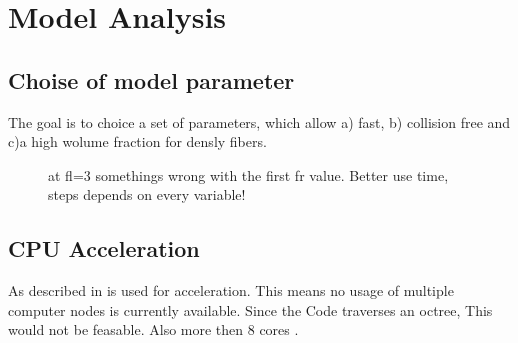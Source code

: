 \chapter{Model Analysis}
\label{cha:model_analysis}
% 
\section{Choise of model parameter}
% 
The goal is to choice a set of parameters, which allow a) fast, b) collision free and c)a high wolume fraction for densly fibers. 
% 
\begin{figure}[!tb]
\centering
{}
\caption{at fl=3 somethings wrong with the first fr value. Better use time, steps depends on every variable!}
\end{figure}
% 
\section{CPU Acceleration}
% 
As described in \dummy \openmp is used for acceleration. This means no usage of multiple computer nodes is currently available. Since the Code traverses an octree, This would not be feasable. Also more then 8 cores \dummy. 
% 